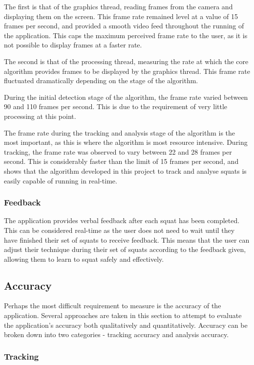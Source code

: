 The first is that of the graphics thread, reading frames from the camera and displaying them on the screen. This frame rate remained level at a value of 15 frames per second, and provided a smooth video feed throughout the running of the application. This caps the maximum perceived frame rate to the user, as it is not possible to display frames at a faster rate.

The second is that of the processing thread, measuring the rate at which the core algorithm provides frames to be displayed by the graphics thread. This frame rate fluctuated dramatically depending on the stage of the algorithm.

During the initial detection stage of the algorithm, the frame rate varied between 90 and 110 frames per second. This is due to the requirement of very little processing at this point.

The frame rate during the tracking and analysis stage of the algorithm is the most important, as this is where the algorithm is most resource intensive. During tracking, the frame rate was observed to vary between 22 and 28 frames per second. This is considerably faster than the limit of 15 frames per second, and shows that the algorithm developed in this project to track and analyse squats is easily capable of running in real-time.

\subsubsection{Feedback}
The application provides verbal feedback after each squat has been completed. This can be considered real-time as the user does not need to wait until they have finished their set of squats to receive feedback. This means that the user can adjust their technique during their set of squats according to the feedback given, allowing them to learn to squat safely and effectively.

\subsection{Accuracy}
Perhaps the most difficult requirement to measure is the accuracy of the application. Several approaches are taken in this section to attempt to evaluate the application's accuracy both qualitatively and quantitatively. Accuracy can be broken down into two categories - tracking accuracy and analysis accuracy.

\subsubsection{Tracking}

